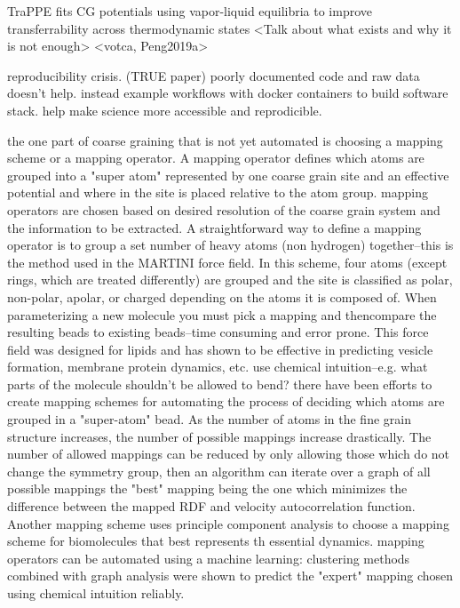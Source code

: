 TraPPE fits CG potentials using vapor-liquid equilibria to improve transferrability across thermodynamic states\cite{Maerzke2011}
<Talk about what exists and why it is not enough>
<votca, Peng2019a>

reproducibility crisis.\cite{Cummings2019} \cite{Thompson2020} (TRUE paper) poorly documented code and raw data doesn't help. 
instead example workflows with docker containers to build software stack. help make science more accessible and reprodicible.

the one part of coarse graining that is not yet automated is choosing a mapping scheme or a mapping operator. A mapping operator defines which atoms are grouped into a "super atom" represented by one coarse grain site and an effective potential and where in the site is placed relative to the atom group.
mapping operators are chosen based on desired resolution of the coarse grain system and the information to be extracted. 
A straightforward way to define a mapping operator is to group a set number of heavy atoms (non hydrogen) together--this is the method used in the MARTINI force field. \cite{Marrink2007} In this scheme, four atoms (except rings, which are treated differently) are grouped and the site is classified as polar, non-polar, apolar, or charged depending on the atoms it is composed of. When parameterizing a new molecule you must pick a mapping and thencompare the resulting beads to existing beads--time consuming and error prone.\cite{http://www.cgmartini.nl/index.php/tutorials-general-introduction-gmx5/parametrzining-new-molecule-gmx5} This force field was designed for lipids and has shown to be effective in predicting vesicle formation, membrane protein dynamics, etc.
use chemical intuition--e.g. what parts of the molecule shouldn't be allowed to bend?
there have been efforts to create mapping schemes for automating the process of deciding which atoms are grouped in a "super-atom" bead. 
As the number of atoms in the fine grain structure increases, the number of possible mappings increase drastically. The number of allowed mappings can be reduced by only allowing those which do not change the symmetry group, then an algorithm can iterate over a graph of all possible mappings the "best" mapping being the one which minimizes the difference between the mapped RDF and velocity autocorrelation function. \cite{Chakraborty2018a}
Another mapping scheme uses principle component analysis to choose a mapping scheme for biomolecules that best represents th essential dynamics. \cite{Zhang2008}
\cite{li2020} mapping operators can be automated using a machine learning: clustering methods combined with graph analysis were shown to predict the "expert" mapping chosen using chemical intuition reliably.
